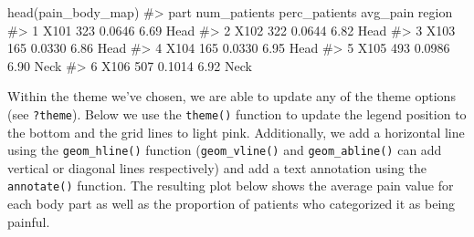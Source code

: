 \documentclass[
  letterpaper,
]{krantz}
\makeatletter
\newenvironment{Shaded}{\begin{snugshade}}{\end{snugshade}}
\newcommand{\AttributeTok}[1]{\textcolor[rgb]{0.40,0.45,0.13}{#1}}
\newcommand{\CommentTok}[1]{\textcolor[rgb]{0.37,0.37,0.37}{#1}}
\newcommand{\FloatTok}[1]{\textcolor[rgb]{0.68,0.00,0.00}{#1}}
\newcommand{\FunctionTok}[1]{\textcolor[rgb]{0.28,0.35,0.67}{#1}}
\newcommand{\NormalTok}[1]{\textcolor[rgb]{0.00,0.23,0.31}{#1}}
\newcommand{\SpecialCharTok}[1]{\textcolor[rgb]{0.37,0.37,0.37}{#1}}
\newcommand{\StringTok}[1]{\textcolor[rgb]{0.13,0.47,0.30}{#1}}
\newenvironment{kframe}{%
\medskip{}
\setlength{\fboxsep}{.8em}
 \def\at@end@of@kframe{}%
 \ifinner\ifhmode%
  \def\at@end@of@kframe{\end{minipage}}%
  \begin{minipage}{\columnwidth}%
 \fi\fi%
 \def\FrameCommand##1{\hskip\@totalleftmargin \hskip-\fboxsep
 \colorbox{shadecolor}{##1}\hskip-\fboxsep
     \hskip-\linewidth \hskip-\@totalleftmargin \hskip\columnwidth}%
 \MakeFramed {\advance\hsize-\width
   \@totalleftmargin\z@ \linewidth\hsize
   \@setminipage}}%
 {\par\unskip\endMakeFramed%
 \at@end@of@kframe}
\renewenvironment{Shaded}{\begin{kframe}}{\end{kframe}}
\makeatother
\begin{document}
\begin{Shaded}
\begin{Highlighting}[]
\FunctionTok{head}\NormalTok{(pain\_body\_map)}
\CommentTok{\#\textgreater{}   part num\_patients perc\_patients avg\_pain region}
\CommentTok{\#\textgreater{} 1 X101          323        0.0646     6.69   Head}
\CommentTok{\#\textgreater{} 2 X102          322        0.0644     6.82   Head}
\CommentTok{\#\textgreater{} 3 X103          165        0.0330     6.86   Head}
\CommentTok{\#\textgreater{} 4 X104          165        0.0330     6.95   Head}
\CommentTok{\#\textgreater{} 5 X105          493        0.0986     6.90   Neck}
\CommentTok{\#\textgreater{} 6 X106          507        0.1014     6.92   Neck}
\end{Highlighting}
\end{Shaded}

Within the theme we've chosen, we are able to update any of the theme
options (see \texttt{?theme}). Below we use the \texttt{theme()}
function to update the legend position to the bottom and the grid lines
to light pink. Additionally, we add a horizontal line using the
\texttt{geom\_hline()} function (\texttt{geom\_vline()} and
\texttt{geom\_abline()} can add vertical or diagonal lines respectively)
and add a text annotation using the \texttt{annotate()} function. The
resulting plot below shows the average pain value for each body part as
well as the proportion of patients who categorized it as being painful.

\begin{Shaded}
\end{Shaded}
\end{document}
